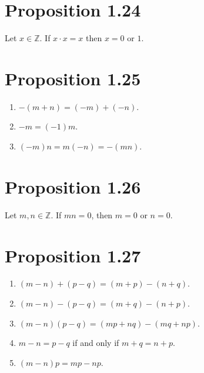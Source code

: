 \section*{Proposition 1.24}
Let $x \in \mathbb{Z}$. If $x \cdot x = x$ then $x = 0$ or $1$.

\section*{Proposition 1.25}
\begin{enumerate}[label=(\roman*)]
    \item $-(m+n) = (-m) + (-n)$.
    \item $-m = (-1)m$.
    \item $(-m)n = m(-n) = -(mn)$.
\end{enumerate}

\section*{Proposition 1.26}
Let $m, n \in \mathbb{Z}$. If $mn = 0$, then $m = 0$ or $n = 0$.

\section*{Proposition 1.27}
\begin{enumerate}[label=(\roman*)]
    \item $(m-n) + (p-q) = (m+p) - (n+q)$.
    \item $(m-n) - (p-q) = (m+q) - (n+p)$.
    \item $(m-n)(p-q) = (mp+nq) - (mq+np)$.
    \item $m-n = p-q$ if and only if $m+q = n+p$.
    \item $(m-n)p = mp - np$.
\end{enumerate}

